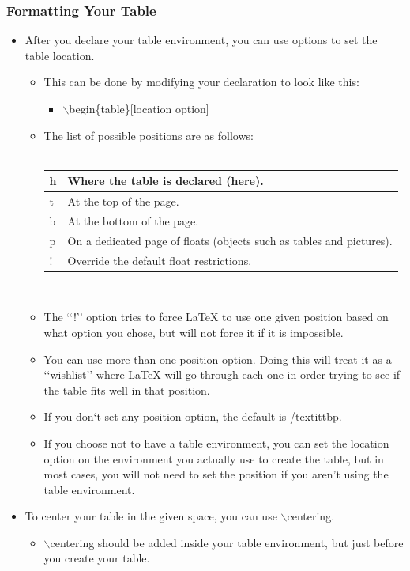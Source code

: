 		\subsubsection{Formatting Your Table}
			\begin{itemize}
				\item After you declare your table environment, you can use options to set the table location.
				\begin{itemize}
					\item This can be done by modifying your declaration to look like this:
					\begin{itemize}
						\item $\backslash$begin\{table\}[location option]
					\end{itemize}
					\item The list of possible positions are as follows:\\\\
					\def\arraystretch{1.4}
					\begin{tabularx}{\textwidth}{| l | X |}
						\hline
						h & Where the table is declared (here).\\
						\hline
						t & At the top of the page.\\
						\hline
						b & At the bottom of the page.\\
						\hline
						p & On a dedicated page of floats (objects such as tables and pictures).\\
						\hline
						! & Override the default float restrictions.\\
						\hline
					\end{tabularx}\\
					\item The \lq\lq{}!\rq\rq{} option tries to force \LaTeX{} to use one given position based on what option you chose, but will not force it if it is impossible.
					\item You can use more than one position option. Doing this will treat it as a \lq\lq{}wishlist\rq\rq{} where \LaTeX{} will go through each one in order trying to see if the table fits well in that position.
					\item If you don\lq{}t set any position option, the default is /textit{tbp}.
					\item If you choose not to have a table environment, you can set the location option on the environment you actually use to create the table, but in most cases, you will not need to set the position if you aren\rq{}t using the table environment.
				\end{itemize}
				\item To center your table in the given space, you can use $\backslash$centering.
				\begin{itemize}
					\item $\backslash$centering should be added inside your table environment, but just before you create your table.
				\end{itemize}


\end{itemize}
